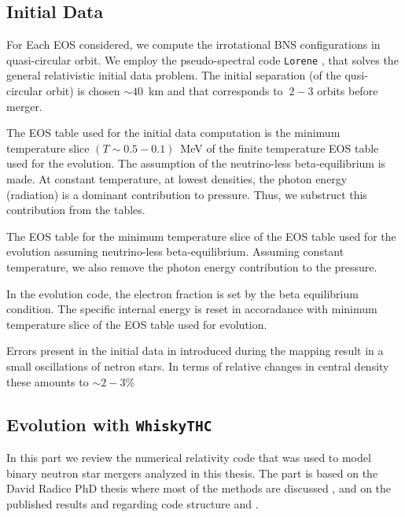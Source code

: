 \documentclass[11pt,a4paper,headinclude=true,DIV=14,BCOR=8mm,chapterprefix,listof=totoc,twoside,openright,abstracton]{scrbook}
\begin{document}
\subsection{Initial Data}

For Each EOS considered, we compute the irrotational BNS configurations in quasi-circular orbit.
We employ the pseudo-spectral code \texttt{Lorene} \citep{Gourgoulhon:2000nn}, that 
solves the general relativistic initial data problem.
The initial separation (of the qusi-circular orbit) is chosen $\sim40$~km and that corresponds to $~2-3$ orbits before merger.

The EOS table used for the initial data computation is the minimum temperature slice
$(T\sim 0.5 - 0.1)$~MeV of the finite temperature EOS table used for the evolution.
The assumption of the neutrino-less beta-equilibrium is made.
At constant temperature, at lowest densities, the photon energy (radiation) is a dominant contribution to 
pressure. Thus, we substruct this contribution from the tables.

The EOS table for the minimum temperature slice of the EOS table used for the evolution assuming neutrino-less beta-equilibrium.
Assuming constant temperature, we also remove the photon energy contribution to the pressure.

In the evolution code, the electron fraction is set by the beta equilibrium condition. 
The specific internal energy is reset in accoradance with minimum temperature slice of the EOS table used for evolution.

Errors present in the initial data in introduced during the mapping result in a small oscillations of netron stars.
In terms of relative changes in central density these amounts to $\sim2-3\%$ \cite{Radice:2018pdn}


\subsection{Evolution with \texttt{WhiskyTHC}}

In this part we review the numerical relativity code that was used to model binary neutron star mergers analyzed in this thesis.
The part is based on the David Radice PhD thesis where most of the methods are discussed \cite{Radice:2013apa}, and on the published results and regarding code structure and \cite{Radice:2012cu,Radice:2013xpa,Radice:2013hxh,Radice:2015nva}.
\end{document}
